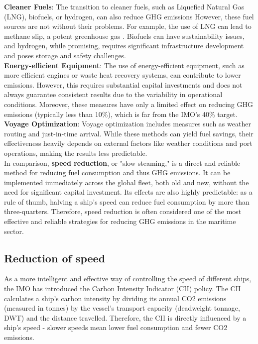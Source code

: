 \documentclass[a4paper,12pt]{article}
\begin{document}
\textbf{Cleaner Fuels}: The transition to cleaner fuels, such as Liquefied Natural Gas (LNG), biofuels, or hydrogen, can also reduce GHG emissions
However, these fuel sources are not without their problems. For example, the use of LNG can lead to methane slip, a potent greenhouse gas \cite{gore2022cost}.
Biofuels can have sustainability issues, and hydrogen, while promising, requires significant infrastructure development and poses storage and safety challenges.\\

\textbf{Energy-efficient Equipment}: The use of energy-efficient equipment, such as more efficient engines or waste heat recovery systems, can contribute to lower emissions. However, this requires substantial capital investments and does not always guarantee consistent results due to the variability in operational conditions.
Moreover, these measures have only a limited effect on reducing GHG emissions (typically less than 10\%), which is far from the IMO's 40\% target.\\

\textbf{Voyage Optimization}: Voyage optimization includes measures such as weather routing and just-in-time arrival. While these methods can yield fuel savings, their effectiveness heavily depends on external factors like weather conditions and port operations, making the results less predictable.\\

In comparison, \textbf{speed reduction}, or "slow steaming," is a direct and reliable method for reducing fuel consumption and thus GHG emissions.
It can be implemented immediately across the global fleet, both old and new, without the need for significant capital investment.
Its effects are also highly predictable: as a rule of thumb, halving a ship's speed can reduce fuel consumption by more than three-quarters.
Therefore, speed reduction is often considered one of the most effective and reliable strategies for reducing GHG emissions in the maritime sector.\\

\subsection{Reduction of speed}
As a more intelligent and effective way of controlling the speed of different ships, the IMO has introduced the Carbon Intensity Indicator (CII) policy.
The CII calculates a ship's carbon intensity by dividing its annual CO2 emissions (measured in tonnes) by the vessel's transport capacity (deadweight tonnage, DWT) and the distance travelled. Therefore, the CII is directly influenced by a ship's speed - slower speeds mean lower fuel consumption and fewer CO2 emissions.\\
\end{document}
